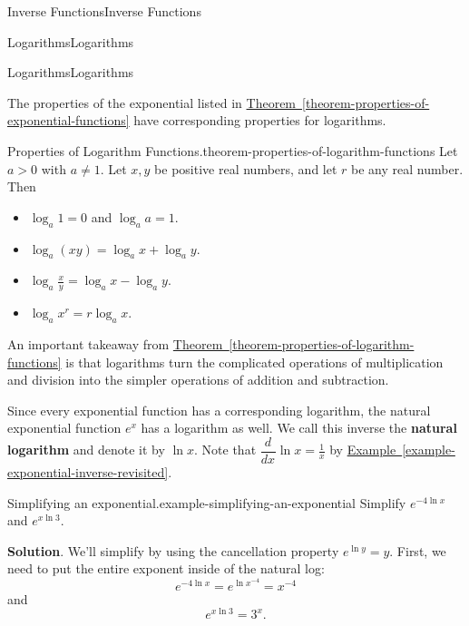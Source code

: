 \documentclass[10pt,]{book}
\newcommand{\terminology}[1]{\textbf{#1}}
\numberwithin{equation}{section}
\newcommand{\dv}[3][]{\dfrac{d^{#1} #2}{d #3^{#1}}}
\begin{document}
\begin{chapterptx}{Inverse Functions}{}{Inverse Functions}{}{}
\begin{sectionptx}{Logarithms}{}{Logarithms}{}{}
\begin{subsectionptx}{Logarithms}{}{Logarithms}{}{}
\par
\hypertarget{p-219}{}%
The properties of the exponential listed in \hyperref[theorem-properties-of-exponential-functions]{Theorem~\ref{theorem-properties-of-exponential-functions}} have corresponding properties for logarithms.%
\begin{theorem}{Properties of Logarithm Functions.}{}{theorem-properties-of-logarithm-functions}%
\hypertarget{p-220}{}%
Let \(a>0\) with \(a\neq1\). Let \(x,y\) be positive real numbers, and let \(r\) be any real number. Then \leavevmode%
\begin{itemize}[label=\textbullet]
\item{}\(\log_{a}1 = 0\) and \(\log_{a}a = 1\).%
\item{}\(\log_{a}(xy) = \log_{a}x + \log_{a}y\).%
\item{}\(\log_{a}\frac{x}{y} = \log_{a}x - \log_{a}y\).%
\item{}\(\log_{a}x^{r} = r\log_{a}x\).%
\end{itemize}
%
\end{theorem}
\hypertarget{p-221}{}%
An important takeaway from \hyperref[theorem-properties-of-logarithm-functions]{Theorem~\ref{theorem-properties-of-logarithm-functions}} is that logarithms turn the complicated operations of multiplication and division into the simpler operations of addition and subtraction.%
\par
\hypertarget{p-222}{}%
Since every exponential function has a corresponding logarithm, the natural exponential function \(e^{x}\) has a logarithm as well. We call this inverse the \terminology{natural logarithm} and denote it by \(\ln x\). Note that \(\dv{}{x}\ln x = \frac{1}{x}\) by \hyperref[example-exponential-inverse-revisited]{Example~\ref{example-exponential-inverse-revisited}}.%
\begin{example}{Simplifying an exponential.}{example-simplifying-an-exponential}%
\hypertarget{p-223}{}%
Simplify \(e^{-4\ln x}\) and \(e^{x\ln3}\).%
\par\smallskip%
\noindent\textbf{Solution}.\hypertarget{solution-48}{}\quad%
\hypertarget{p-224}{}%
We'll simplify by using the cancellation property \(e^{\ln y} = y\). First, we need to put the entire exponent inside of the natural log:%
\begin{equation*}
e^{-4\ln x} = e^{\ln x^{-4}} = x^{-4}
\end{equation*}
and%
\begin{equation*}
e^{x\ln3} = 3^{x}.
\end{equation*}

\end{example}
\end{subsectionptx}
\end{sectionptx}
\end{chapterptx}
\end{document}
